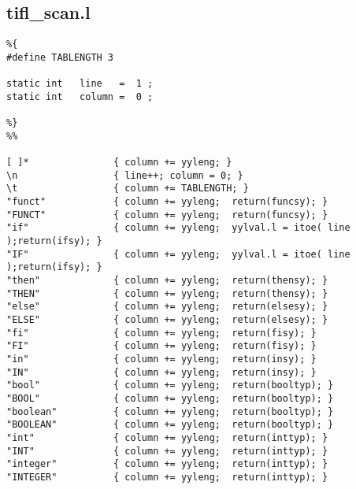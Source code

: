 \subsection{tifl\_scan.l}
\begin{verbatim}
%{
#define TABLENGTH 3

static int   line   =  1 ;
static int   column =  0 ;

%}
%%

[ ]*               { column += yyleng; }
\n                 { line++; column = 0; }
\t                 { column += TABLENGTH; }
"funct"            { column += yyleng;  return(funcsy); }
"FUNCT"            { column += yyleng;  return(funcsy); }
"if"               { column += yyleng;  yylval.l = itoe( line );return(ifsy); }
"IF"               { column += yyleng;  yylval.l = itoe( line );return(ifsy); }
"then"             { column += yyleng;  return(thensy); }
"THEN"             { column += yyleng;  return(thensy); }
"else"             { column += yyleng;  return(elsesy); }
"ELSE"             { column += yyleng;  return(elsesy); }
"fi"               { column += yyleng;  return(fisy); }
"FI"               { column += yyleng;  return(fisy); }
"in"               { column += yyleng;  return(insy); }
"IN"               { column += yyleng;  return(insy); }
"bool"             { column += yyleng;  return(booltyp); }
"BOOL"             { column += yyleng;  return(booltyp); }
"boolean"          { column += yyleng;  return(booltyp); }
"BOOLEAN"          { column += yyleng;  return(booltyp); }
"int"              { column += yyleng;  return(inttyp); }
"INT"              { column += yyleng;  return(inttyp); }
"integer"          { column += yyleng;  return(inttyp); }
"INTEGER"          { column += yyleng;  return(inttyp); }


\end{verbatim}
